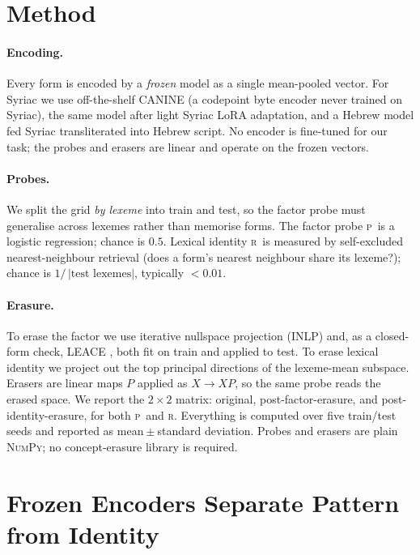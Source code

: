 \documentclass[11pt]{article}
\newcommand{\R}{\textsc{r}}
\newcommand{\Pp}{\textsc{p}}
\begin{document}
\section{Method}
\label{sec:method}

\paragraph{Encoding.}
Every form is encoded by a \emph{frozen} model as a single mean-pooled vector. For
Syriac we use off-the-shelf CANINE (a codepoint byte encoder never trained on
Syriac), the same model after light Syriac LoRA adaptation, and a Hebrew model fed
Syriac transliterated into Hebrew script. No encoder is fine-tuned for our task;
the probes and erasers are linear and operate on the frozen vectors.

\paragraph{Probes.}
We split the grid \emph{by lexeme} into train and test, so the factor probe must
generalise across lexemes rather than memorise forms. The factor probe \Pp\ is a
logistic regression; chance is $0.5$. Lexical identity \R\ is measured by
self-excluded nearest-neighbour retrieval (does a form's nearest neighbour share its
lexeme?); chance is $1/{\,}|\text{test lexemes}|$, typically $<0.01$.

\paragraph{Erasure.}
To erase the factor we use iterative nullspace projection (INLP)
\citep{ravfogel2020null} and, as a closed-form check, LEACE
\citep{belrose2023leace}, both fit on train and applied to test. To erase lexical
identity we project out the top principal directions of the lexeme-mean subspace.
Erasers are linear maps $P$ applied as $X\!\to\!XP$, so the same probe reads the
erased space. We report the $2\times2$ matrix: original, post-factor-erasure, and
post-identity-erasure, for both \Pp\ and \R. Everything is computed over five
train/test seeds and reported as mean${}\pm{}$standard deviation. Probes and erasers
are plain \textsc{NumPy}; no concept-erasure library is required.

\section{Frozen Encoders Separate Pattern from Identity}
\label{sec:syriac}
\end{document}
